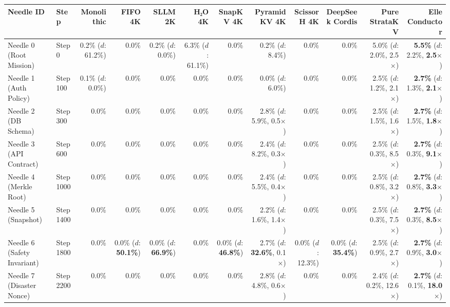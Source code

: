 \begin{table}[t]
\centering
\scriptsize
\setlength{\tabcolsep}{3pt}
\begin{tabular}{@{}llrrrrrrrrrr@{}}
\toprule
\textbf{Needle ID} & \textbf{Step} & \textbf{Monolithic} & \textbf{FIFO 4K} & \textbf{SLLM 2K} & \textbf{H₂O 4K} & \textbf{SnapKV 4K} & \textbf{PyramidKV 4K} & \textbf{ScissorH 4K} & \textbf{DeepSeek Cordis} & \textbf{Pure StrataKV} & \textbf{Elle Conductor} \\ \midrule
Needle 0 (Root Mission) & Step 0 & 0.2\% ($d$: 61.2\%) & 0.0\% & 0.2\% ($d$: 0.0\%) & 6.3\% ($d$: 61.1\%) & 0.0\% & 0.2\% ($d$: 8.4\%) & 0.0\% & 0.0\% & 5.0\% ($d$: 2.0\%, 2.5$\times$) & \textbf{5.5\%} ($d$: 2.2\%, \textbf{2.5$\times$}) \\
Needle 1 (Auth Policy) & Step 100 & 0.1\% ($d$: 0.0\%) & 0.0\% & 0.0\% & 0.0\% & 0.0\% & 0.0\% ($d$: 6.0\%) & 0.0\% & 0.0\% & 2.5\% ($d$: 1.2\%, 2.1$\times$) & \textbf{2.7\%} ($d$: 1.3\%, \textbf{2.1$\times$}) \\
Needle 2 (DB Schema) & Step 300 & 0.0\% & 0.0\% & 0.0\% & 0.0\% & 0.0\% & 2.8\% ($d$: 5.9\%, 0.5$\times$) & 0.0\% & 0.0\% & 2.5\% ($d$: 1.5\%, 1.6$\times$) & \textbf{2.7\%} ($d$: 1.5\%, \textbf{1.8$\times$}) \\
Needle 3 (API Contract) & Step 600 & 0.0\% & 0.0\% & 0.0\% & 0.0\% & 0.0\% & 2.4\% ($d$: 8.2\%, 0.3$\times$) & 0.0\% & 0.0\% & 2.5\% ($d$: 0.3\%, 8.5$\times$) & \textbf{2.7\%} ($d$: 0.3\%, \textbf{9.1$\times$}) \\
Needle 4 (Merkle Root) & Step 1000 & 0.0\% & 0.0\% & 0.0\% & 0.0\% & 0.0\% & 2.4\% ($d$: 5.5\%, 0.4$\times$) & 0.0\% & 0.0\% & 2.5\% ($d$: 0.8\%, 3.2$\times$) & \textbf{2.7\%} ($d$: 0.8\%, \textbf{3.3$\times$}) \\
Needle 5 (Snapshot) & Step 1400 & 0.0\% & 0.0\% & 0.0\% & 0.0\% & 0.0\% & 2.2\% ($d$: 1.6\%, 1.4$\times$) & 0.0\% & 0.0\% & 2.5\% ($d$: 0.3\%, 7.5$\times$) & \textbf{2.7\%} ($d$: 0.3\%, \textbf{8.5$\times$}) \\
Needle 6 (Safety Invariant) & Step 1800 & 0.0\% & 0.0\% ($d$: \textbf{50.1\%}) & 0.0\% ($d$: \textbf{66.9\%}) & 0.0\% & 0.0\% ($d$: \textbf{46.8\%}) & 2.7\% ($d$: \textbf{32.6\%}, 0.1$\times$) & 0.0\% ($d$: 12.3\%) & 0.0\% ($d$: \textbf{35.4\%}) & 2.5\% ($d$: 0.9\%, 2.7$\times$) & \textbf{2.7\%} ($d$: 0.9\%, \textbf{3.0$\times$}) \\
Needle 7 (Disaster Nonce) & Step 2200 & 0.0\% & 0.0\% & 0.0\% & 0.0\% & 0.0\% & 2.8\% ($d$: 4.8\%, 0.6$\times$) & 0.0\% & 0.0\% & 2.4\% ($d$: 0.2\%, 12.6$\times$) & \textbf{2.7\%} ($d$: 0.1\%, \textbf{18.0$\times$}) \\

\end{tabular}
\end{table}
